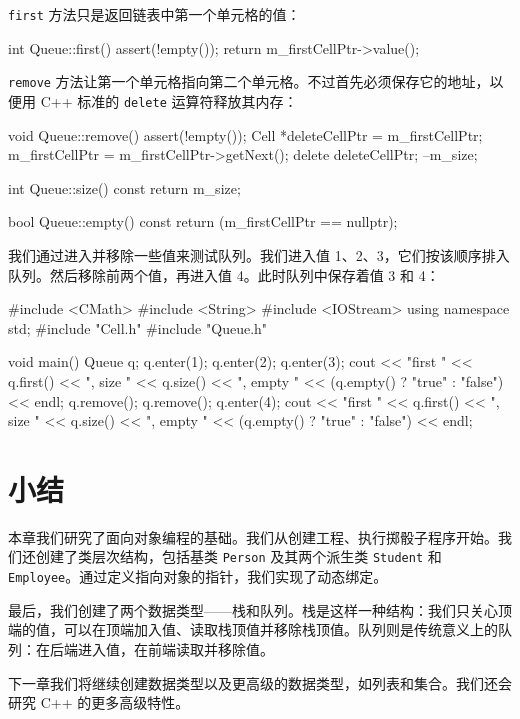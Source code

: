 \texttt{first} 方法只是返回链表中第一个单元格的值：

\begin{codebox}
int Queue::first() {
  assert(!empty());
  return m_firstCellPtr->value();
}
\end{codebox}

\texttt{remove} 方法让第一个单元格指向第二个单元格。不过首先必须保存它的地址，以便用 C++ 标准的 \texttt{delete} 运算符释放其内存：

\begin{codebox}
void Queue::remove() {
  assert(!empty());
  Cell *deleteCellPtr = m_firstCellPtr;
  m_firstCellPtr = m_firstCellPtr->getNext();
  delete deleteCellPtr;
  --m_size;
}

int Queue::size() const {
  return m_size;
}

bool Queue::empty() const {
  return (m_firstCellPtr == nullptr);
}
\end{codebox}

我们通过进入并移除一些值来测试队列。我们进入值 1、2、3，它们按该顺序排入队列。然后移除前两个值，再进入值 4。此时队列中保存着值 3 和 4：

\medskip{}

\begin{codebox}
#include <CMath>
#include <String>
#include <IOStream>
using namespace std;
#include "Cell.h"
#include "Queue.h"

void main() {
  Queue q;
  q.enter(1);
  q.enter(2);
  q.enter(3);
  cout << "first " << q.first() << ", size " << q.size()
       << ", empty " << (q.empty() ? "true" : "false") << endl;
  q.remove();
  q.remove();
  q.enter(4);
  cout << "first " << q.first() << ", size " << q.size()
       << ", empty " << (q.empty() ? "true" : "false") << endl;
}
\end{codebox}

\section{小结}

本章我们研究了面向对象编程的基础。我们从创建工程、执行掷骰子程序开始。我们还创建了类层次结构，包括基类 \texttt{Person} 及其两个派生类 \texttt{Student} 和 \texttt{Employee}。通过定义指向对象的指针，我们实现了动态绑定。

最后，我们创建了两个数据类型——栈和队列。栈是这样一种结构：我们只关心顶端的值，可以在顶端加入值、读取栈顶值并移除栈顶值。队列则是传统意义上的队列：在后端进入值，在前端读取并移除值。

下一章我们将继续创建数据类型以及更高级的数据类型，如列表和集合。我们还会研究 C++ 的更多高级特性。
